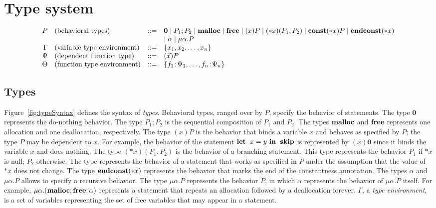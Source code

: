 \section{Type system}
\label{sec:typesystem}

\begin{figure*}
\[
\begin{array}{rlcl}
  P & (\mbox{behavioral types})&::=& \mathbf{0} \mid P_{1};P_{2} \mid \mathbf{malloc} \mid \mathbf{free} \mid (x)P \mid (*x)(P_1,P_2) \mid \mathbf{const}(*x) P  \mid \mathbf{endconst}(*x)\\
  &  &  & \mid \alpha \mid \mu\alpha.P\\
  \Gamma & (\mbox{variable type environment}) &::=& \{x_1, x_2, \dots, x_n\}\\
  \Psi & (\mbox{dependent function type}) &::=& (\vec{x})P\\
  \Theta & (\mbox{function type environment}) &::=& \{f_1\!:\! \Psi_1,\dots,f_n\!:\! \Psi_n\}\\
\end{array}
\]
\caption{Syntax of types.} 
\label{fig:typeSyntax}
\end{figure*}

\subsection{Types}

Figure~\ref{fig:typeSyntax} defines the syntax of \emph{types}.
Behavioral types, ranged over by \(P\), specify the behavior of
statements.  The type $\mathbf{0}$ represents the do-nothing behavior.
The type $P_1;P_2$ is the sequential composition of $P_1$ and $P_2$.
The types $\mathbf{malloc}$ and $\mathbf{free}$ represents one allocation and one
deallocation, respectively.  The type $(x)P$ is the behavior that binds
a variable $x$ and behaves as specified by $P$; the type $P$ may be
dependent to $x$.  For example, the behavior of the statement $\mathbf{let}\;\ x =
y\ \mathbf{in}\;\ \mathbf{skip}$ is represented by $(x)\mathbf{0}$ since it binds the
variable $x$ and does nothing. The type $(*x)(P_1,P_2)$ is the behavior
of a branching statement.  This type represents the behavior $P_1$ if
$*x$ is null; $P_2$ otherwise.  The type represents the behavior of a
statement that works as specified in $P$ under the assumption that the
value of $*x$ does not change.  The type $\mathbf{endconst}(*x)$ represents the
behavior that marks the end of the constantness annotation.  The types
$\alpha$ and $\mu\alpha.P$ allows to specify a recursive behavior.  The
type $\mu\alpha.P$ represents the behavior $P$, in which $\alpha$
represents the behavior of $\mu\alpha.P$ itself.  For example,
$\mu\alpha.(\mathbf{malloc};\mathbf{free};\alpha)$ represents a statement that repeats
an allocation followed by a deallocation forever.  $\Gamma$, a
\emph{type environment}, is a set of variables representing the set of
free variables that may appear in a statement.

